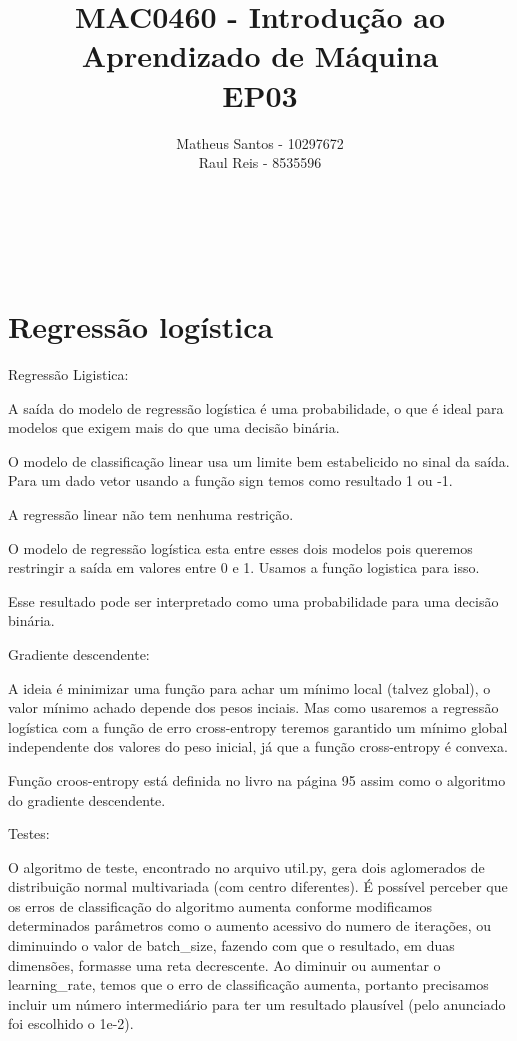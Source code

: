 \documentclass[12pt, a4paper]{article}
\title{MAC0460 - Introdução ao Aprendizado de Máquina \\ EP03}
\author{Matheus Santos - 10297672 \\
        Raul Reis - 8535596}
\begin{document}
\makeatletter
\begin{center}
	{\Large\textbf \@title \\ }
	{\Large \@author \\ }
\end{center}

\vspace{1.1cm}

\section{Regressão logística}

Regressão Ligistica:

A saída do modelo de regressão logística é uma probabilidade, o que é
ideal para modelos que exigem mais do que uma decisão binária.

O modelo de classificação linear usa um limite bem estabelicido no sinal
da saída. Para um dado vetor usando a função sign temos como resultado 1 ou -1.

A regressão linear não tem nenhuma restrição.

O modelo de regressão logística esta entre esses dois modelos pois queremos restringir
a saída em valores entre 0 e 1. Usamos a função logistica para isso.

Esse resultado pode ser interpretado como uma probabilidade para uma decisão binária.


Gradiente descendente:


A ideia é minimizar uma função para achar um mínimo local (talvez global), o valor
mínimo achado depende dos pesos inciais. Mas como usaremos a regressão logística com
a função de erro cross-entropy teremos garantido um mínimo global independente dos 
valores do peso inicial, já que a função cross-entropy é convexa.

Função croos-entropy está definida no livro na página 95 assim como o algoritmo do
gradiente descendente.

Testes: 

O algoritmo de teste, encontrado no arquivo util.py, gera dois aglomerados de distribuição normal multivariada (com centro diferentes). É possível perceber que os erros de classificação do algoritmo aumenta conforme modificamos determinados parâmetros como o aumento acessivo do numero de iterações, ou diminuindo o valor de batch\_size, fazendo com que o resultado, em duas dimensões, formasse uma reta decrescente. Ao diminuir ou aumentar o learning\_rate, temos que o erro de classificação aumenta, portanto precisamos incluir um número intermediário para ter um resultado plausível (pelo anunciado foi escolhido o 1e-2). 
\end{document}
